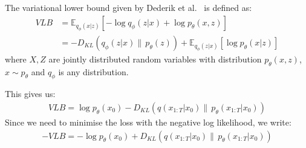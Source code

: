 \documentclass{article}
\numberwithin{equation}{section}
\numberwithin{figure}{section}
\begin{document}
The variational lower bound given by Dederik et al.~\cite{kingma2022autoencoding} is defined as:
\begin{align}
  VLB &= \mathbb{E}_{q_\phi (x | z)} \left[ - \log q_\phi (z | x) + \log p_\theta(x, z) \right] \\[10pt]
  &= - D_{KL} (q_\phi (z | x) \| \, p_\theta (z)) + \mathbb{E}_{q_\phi (z | x)} \left[ \log p_\theta (x | z) \right]
\end{align}
where $X, Z$ are jointly distributed random variables with distribution $p_\theta (x, z)$, $x \sim p_\theta$ and $q_\phi$ is any distribution.

This gives us:
\begin{gather}
  VLB = \log p_{\theta}\left(x_0\right) - D_{KL}\left(q\left(x_{1:T}|x_0\right) \| \, p_{\theta}\left(x_{1:T}|x_0\right)\right)
\end{gather}
Since we need to minimise the loss with the negative log likelihood, we write:
\begin{gather}
  - VLB = - \log p_{\theta}\left(x_0\right) + D_{KL}\left(q\left(x_{1:T}|x_0\right) \| \, p_{\theta}\left(x_{1:T}|x_0\right)\right)
\end{gather}
\end{document}
